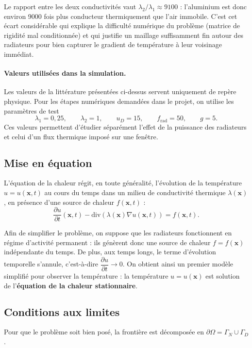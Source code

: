 \documentclass[12pt,a4paper]{article}
\begin{document}
	Le rapport entre les deux conductivités vaut $\lambda_2/\lambda_1 \approx 9100$ : l'aluminium est donc environ 9000 fois plus conducteur thermiquement que l'air immobile. C'est cet écart considérable qui explique la difficulté numérique du problème (matrice de rigidité mal conditionnée) et qui justifie un maillage suffisamment fin autour des radiateurs pour bien capturer le gradient de température à leur voisinage immédiat.
	
	\paragraph{Valeurs utilisées dans la simulation.} Les valeurs de la littérature
	présentées ci-dessus servent uniquement de repère physique. Pour les étapes
	numériques demandées dans le projet, on utilise les paramètres de test
	\[
	\lambda_1=0{,}25,\qquad \lambda_2=1,
	\qquad u_D=15,
	\qquad f_{\mathrm{rad}}=50,
	\qquad g=5.
	\]
	Ces valeurs permettent d'étudier séparément l'effet de la puissance des
	radiateurs et celui d'un flux thermique imposé sur une fenêtre.
	
	\subsection{Mise en équation}
	L'équation de la chaleur régit, en toute généralité, l'évolution de la température $u = u(\mathbf{x}, t)$ au cours du temps dans un milieu de conductivité thermique $\lambda(\mathbf{x})$, en présence d'une source de chaleur $f(\mathbf{x}, t)$ :
	\[
	\frac{\partial u}{\partial t}(\mathbf{x}, t) - \text{div}(\lambda(\mathbf{x}) \nabla u(\mathbf{x}, t)) = f(\mathbf{x}, t).
	\]
	
	Afin de simplifier le problème, on suppose que les radiateurs fonctionnent en régime d'activité permanent : ils génèrent donc une source de chaleur $f = f(\mathbf{x})$ indépendante du temps. De plus, aux temps longs, le terme d'évolution temporelle s'annule, c'est-à-dire $\dfrac{\partial u}{\partial t} \to 0$. On obtient ainsi un premier modèle simplifié pour observer la température : la température $u = u(\mathbf{x})$ est solution de l'\textbf{équation de la chaleur stationnaire}.
	
	\subsection{Conditions aux limites}
	Pour que le problème soit bien posé, la frontière est décomposée en
	$\partial\Omega=\Gamma_N\cup\Gamma_D$.
	
\end{document}
